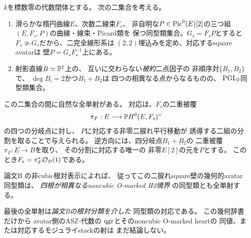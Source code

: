 \begin{theorem}[二捩れsquare壁とnoncubic二根対の幾何同型類の全単射]
\label{thm:qa-avatar-two-torsion-root-pair-bijection}
$k$を標数零の代数閉体とする。
次の二集合を考える。
\begin{enumerate}
\item 滑らかな楕円曲線$E$、次数二線束$F_s$、
非自明な$P\in\operatorname{Pic}^0(E)[2]$の三つ組
$(E,F_s,P)$の曲線・線束・Picard類を
保つ同型類集合。$G_s=F_sP$とすると
$F_s\not\simeq G_s$だから、二完全線形系は
$(2,2)$埋込みを定め、対応するsquare avatarは
壁$P=G_sF_s^{-1}$上にある。
\item 射影直線$B\simeq\mathbb P^1$上の、
互いに交わらない\emph{被約}二点因子の
非順序対$\{B_1,B_2\}$で、
$\deg B_i=2$かつ$B_1+B_2$は
四つの相異なる点からなるものの、
$\operatorname{PGL}_2$同型類集合。
\end{enumerate}
この二集合の間に自然な全単射がある。
対応は、$F_s$の二重被覆
\[
 \pi_F:E\longrightarrow\mathbb P H^0(E,F_s)^\vee
\]
の四つの分岐点に対し、
$P$に対応する非零二捩れ平行移動が
誘導する二組の分割を取ることで与えられる。
逆方向には、四分岐点$B_1+B_2$の
二重被覆$\pi_F:E\to B$を取り、
その分割に対応する唯一の
非零$E[2]$の元を$P$とする。
このとき$F_s=\pi_F^*\mathcal O_B(1)$である。

論文B
\cite[\texttt{thm:noncubic-intrinsic-presentation-equivalence}]{QuadricModuli2026}
の非cubic根対表示によれば、
従ってこの二捩れsquare壁の幾何的avatar同型類は、
\emph{四根が相異なるnoncubic O-marked H2境界}
の同型類とも全単射する。

最後の全単射は\emph{論文Bの根対分類を介した}
同型類の対応である。
この幾何辞書だけから
avatar側のAS$\mathbb Z$-代数の
$\operatorname{qgr}$とそのnoncubic O-marked heartの
同値、または対応するモジュライstackの射は
まだ結論しない。
\end{theorem}
